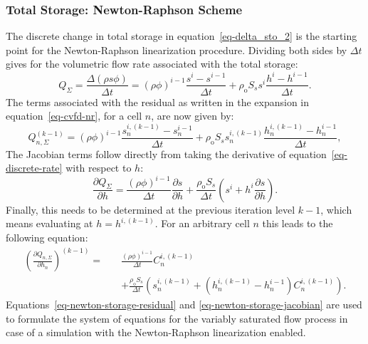 \documentclass[fleqn]{article}
\begin{document}
\subsubsection*{Total Storage: Newton-Raphson Scheme}
The discrete change in total storage in equation~\ref{eq-delta_sto_2}
is the starting point for the Newton-Raphson linearization procedure. 
Dividing both sides by $\Delta t$ gives for the volumetric flow
rate associated with the total storage:
\begin{equation}
  Q_\Sigma = \frac{\Delta (\rho s \phi)}{\Delta t} = 
  (\rho \phi)^{i-1}\frac{s^i - s^{i-1}}{\Delta t} +
  \rho_{\textrm{o}} S_s s^i \frac{h^i - h^{i-1}}{\Delta t}.
  \label{eq-discrete-rate}
\end{equation}
The terms associated with the residual as written in the expansion
in equation~\ref{eq-cvfd-nr}, for a cell $n$, are now given by:
\begin{equation}
  Q_{n,\Sigma}^{(k-1)} =
  (\rho \phi)^{i-1}\frac{s_n^{i,(k-1)} - s_n^{i-1}}{\Delta t} +
  \rho_{\textrm{o}} S_s s_n^{i,(k-1)}
  \frac{h_n^{i,(k-1)} - h_n^{i-1}}{\Delta t},
  \label{eq-newton-storage-residual}
\end{equation}
The Jacobian terms follow directly from taking the derivative
of equation~\ref{eq-discrete-rate} with respect to $h$:
\begin{equation}
  \frac{\partial Q_{\Sigma}}{\partial h} =
  \frac{(\rho\phi)^{i-1}}{\Delta t}
  \frac{\partial s}{\partial h} +
  \frac{\rho_{\textrm{o}} S_s}{\Delta t}
  \left( s^i + h^i \frac{\partial s}{\partial h} \right).
\end{equation}
Finally, this needs to be determined at the previous iteration level
$k-1$, which means evaluating at $h = h^{i,(k-1)}$. For an arbitrary 
cell $n$ this leads to the following equation:
\begin{equation}
  \begin{split}
    \left( \frac{\partial Q_{n,\Sigma}}{\partial h_n} \right)^{(k-1)} = \quad &
    \frac{(\rho\phi)^{i-1}}{\Delta t} C_n^{i,(k-1)} \\
    &+ \frac{\rho_{\textrm{o}} S_s}{\Delta t}
    \left( 
    s_n^{i,(k-1)} + \left( h_n^{i,(k-1)} - h_n^{i-1} \right) C_n^{i,(k-1)}
    \right).
  \end{split}
  \label{eq-newton-storage-jacobian}
\end{equation}
Equations~\ref{eq-newton-storage-residual} and
\ref{eq-newton-storage-jacobian} are used to formulate the system of
equations for the variably saturated flow process in case of
a simulation with the Newton-Raphson linearization enabled.
\end{document}
